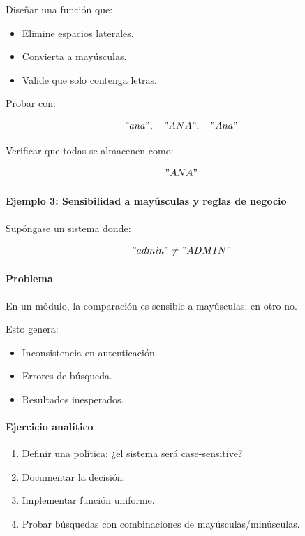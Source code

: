 \documentclass[12pt,twoside]{book}
\begin{document}
						Diseñar una función que:
						
						\begin{itemize}
							\item Elimine espacios laterales.
							\item Convierta a mayúsculas.
							\item Valide que solo contenga letras.
						\end{itemize}
						
						Probar con:
						
						\[
						" ana ",\quad "ANA",\quad "Ana"
						\]
						
						Verificar que todas se almacenen como:
						
						\[
						"ANA"
						\]
						
						\paragraph{Ejemplo 3: Sensibilidad a mayúsculas y reglas de negocio}
						
						\noindent
						Supóngase un sistema donde:
						
						\[
						"admin" \neq "ADMIN"
						\]
						
						\paragraph{Problema}
						
						En un módulo, la comparación es sensible a mayúsculas; en otro no.
						
						Esto genera:
						
						\begin{itemize}
							\item Inconsistencia en autenticación.
							\item Errores de búsqueda.
							\item Resultados inesperados.
						\end{itemize}
						
						\paragraph{Ejercicio analítico}
						
						\begin{enumerate}
							\item Definir una política: ¿el sistema será case-sensitive?
							\item Documentar la decisión.
							\item Implementar función uniforme.
							\item Probar búsquedas con combinaciones de mayúsculas/minúsculas.
						\end{enumerate}
						
\end{document}
